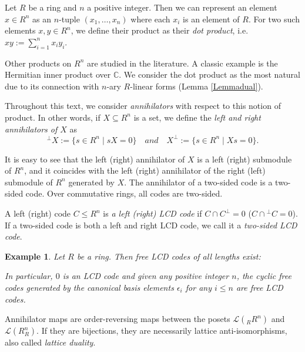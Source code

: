 \documentclass{article}
\theoremstyle{plain}
\newtheorem{Ex}[veta]{Example}
\theoremstyle{plain}
\theoremstyle{remark}
\theoremstyle{plain}
\newcommand{\C}{\mathbb{C}}
\begin{document}
Let $R$ be a ring and $n$ a positive integer. Then we can represent an element $x\in R^n$ as an $n$-tuple $(x_1,\dots, x_n)$ where each $x_i$ is an element of $R$. For two such elements $x, y\in R^n$, we define their product as their \textit{dot product}, i.e. $xy:=\sum_{i=1}^n x_iy_i$. 

Other products on $R^n$ are studied in the literature. A classic example is the Hermitian inner product over $\C$.   We consider the dot product as the most natural due to its connection with $n$-ary $R$-linear forms (Lemma \ref{Lemmadual}).

Throughout this text, we consider \textit{annihilators} with respect to this notion of product. In other words, if $X\subseteq R^n$ is a set, we define the \emph{left and right annihilators of $X$}  as \[{}^\perp X:=\{s\in R^n\mid sX=0 \}\quad and \quad X^\perp:=\{s\in R^n\mid Xs=0\}.\] 

It is easy to see that the left (right) annihilator of $X$ is a left (right) submodule of $R^n$, and it coincides with the left (right) annihilator of the right (left) submodule of $R^n$ generated by $X$. The annihilator of a two-sided code is a two-sided code. Over commutative rings, all codes are two-sided.




A left (right) code $C\leq R^n$ is \textit{a left (right) LCD code} if $C\cap C^\perp=0$  ($C\cap {}^\perp C=0$). If a two-sided code is both a left and right LCD code, we call it a \textit{two-sided LCD code}.

\begin{Ex}\label{Extrivial}
    Let $R$ be a ring. Then free LCD codes of all lengths exist:

    In particular, $0$ is an LCD code and given any positive integer $n$, the cyclic free codes generated by the canonical basis elements $\epsilon_i$ for any $i\leq n$ are free LCD codes.
\end{Ex}

Annihilator maps are order-reversing maps between the posets $\mathcal{L}({}_RR^n)$ and $\mathcal{L}(R^n_R)$. If they are bijections, they are necessarily lattice anti-isomorphisms, also called \textit{lattice duality}. 
\end{document}

